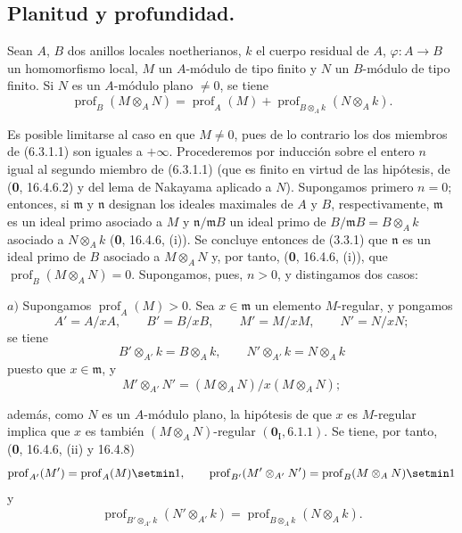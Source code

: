 \subsection{Planitud y profundidad.}

\begin{proposition}[6.3.1]
Sean $A$, $B$ dos anillos locales noetherianos, $k$ el cuerpo residual de
$A$, $\varphi:A\to B$ un homomorfismo local, $M$ un $A$-módulo de tipo finito
y $N$ un $B$-módulo de tipo finito. Si $N$ es un $A$-módulo plano $\neq0$, se
tiene
\begin{equation}
\operatorname{prof}_B(M\otimes_AN)=\operatorname{prof}_A(M)
+\operatorname{prof}_{B\otimes_Ak}(N\otimes_Ak).
\tag{6.3.1.1}\label{IV.2.s6.3.1.1-fr}
\end{equation}
\end{proposition}

Es posible limitarse al caso en que $M\neq0$, pues de lo contrario los dos
miembros de (6.3.1.1) son iguales a $+\infty$. Procederemos por inducción sobre
el entero $n$ igual al segundo miembro de (6.3.1.1) (que es finito en virtud
de las hipótesis, de (\textbf 0, 16.4.6.2) y del lema de Nakayama aplicado a $N$).
Supongamos primero $n=0$; entonces, si $\mathfrak m$ y $\mathfrak n$ designan
los ideales maximales de $A$ y $B$, respectivamente, $\mathfrak m$ es un ideal
primo asociado a $M$ y $\mathfrak n/\mathfrak mB$ un ideal primo de
$B/\mathfrak mB=B\otimes_Ak$ asociado a $N\otimes_Ak$ (\textbf 0, 16.4.6, (i)). Se
concluye entonces de (3.3.1) que $\mathfrak n$ es un ideal primo de $B$
asociado a $M\otimes_AN$ y, por tanto, (\textbf 0, 16.4.6, (i)), que
$\operatorname{prof}_B(M\otimes_AN)=0$. Supongamos, pues, $n>0$, y distingamos
dos casos:

$a)$ Supongamos $\operatorname{prof}_A(M)>0$. Sea $x\in\mathfrak m$ un
elemento $M$-regular, y pongamos
\[
A'=A/xA,\qquad B'=B/xB,\qquad M'=M/xM,\qquad N'=N/xN;
\]
se tiene
\[
B'\otimes_{A'}k=B\otimes_Ak,\qquad N'\otimes_{A'}k=N\otimes_Ak
\]
puesto que $x\in\mathfrak m$, y
\[
M'\otimes_{A'}N'=(M\otimes_AN)/x(M\otimes_AN);
\]


además, como $N$ es un $A$-módulo plano, la hipótesis de que $x$ es
$M$-regular implica que $x$ es también $(M\otimes_AN)$-regular
$(\mathbf{0}_{\mathrm I}, 6.1.1)$. Se tiene, por tanto, (\textbf 0, 16.4.6, (ii) y 16.4.8)
\[
\operatorname{prof}_{A'}(M')=\operatorname{prof}_A(M)\setmin 1,
\qquad
\operatorname{prof}_{B'}(M'\otimes_{A'}N')
=\operatorname{prof}_B(M\otimes_AN)\setmin 1
\]
y
\[
\operatorname{prof}_{B'\otimes_{A'}k}(N'\otimes_{A'}k)
=\operatorname{prof}_{B\otimes_Ak}(N\otimes_Ak).
\]


